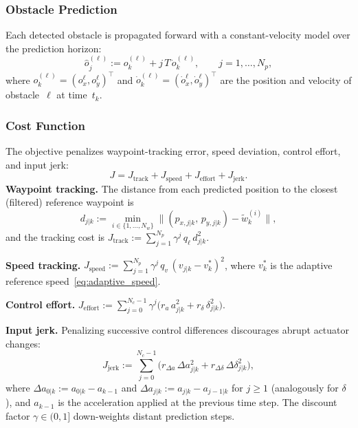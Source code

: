\documentclass[conference]{IEEEtran}
\begin{document}
\subsubsection{Obstacle Prediction}

Each detected obstacle is propagated forward with a
constant-velocity model over the prediction horizon:
\begin{equation}\label{eq:obs_pred}
  \hat{o}_j^{(\ell)} := o_k^{(\ell)} + j\,T\,\dot{o}_k^{(\ell)},
  \qquad j = 1,\ldots,N_p,
\end{equation}
where $o_k^{(\ell)} = (o_x^\ell, o_y^\ell)^\top$ and
$\dot{o}_k^{(\ell)} = (\dot{o}_x^\ell, \dot{o}_y^\ell)^\top$
are the position and velocity of obstacle~$\ell$ at time~$t_k$.

\subsubsection{Cost Function}

The objective penalizes waypoint-tracking error, speed deviation,
control effort, and input jerk:
\begin{equation}\label{eq:mpc_cost}
  J = J_{\mathrm{track}} + J_{\mathrm{speed}}
    + J_{\mathrm{effort}} + J_{\mathrm{jerk}}.
\end{equation}
\textbf{Waypoint tracking.} The distance from each predicted
position to the closest (filtered) reference waypoint is
\begin{equation}\label{eq:closest_wp}
  d_{j|k} := \min_{i \in \{1,\ldots,N_w\}}
  \bigl\|(p_{x,j|k},\, p_{y,j|k})
  - \tilde{w}^{(i)}_k\bigr\|,
\end{equation}
and the tracking cost is
$J_{\mathrm{track}} := \sum_{j=1}^{N_p}
  \gamma^j\, q_\ell \, d_{j|k}^2$.

\noindent\textbf{Speed tracking.}
$J_{\mathrm{speed}} := \sum_{j=1}^{N_p}
  \gamma^j\, q_v\, (v_{j|k} - v^*_k)^2$,
where $v^*_k$ is the adaptive reference speed~\eqref{eq:adaptive_speed}.

\noindent\textbf{Control effort.}
$J_{\mathrm{effort}} := \sum_{j=0}^{N_c-1}
  \gamma^j\bigl(r_a\,a_{j|k}^2 + r_\delta\,\delta_{j|k}^2\bigr)$.

\noindent\textbf{Input jerk.}
Penalizing successive control differences discourages abrupt
actuator changes:
\begin{equation}\label{eq:jerk}
  J_{\mathrm{jerk}} :=
  \sum_{j=0}^{N_c-1}
  \bigl(r_{\Delta a}\,\Delta a_{j|k}^2
  + r_{\Delta\delta}\,\Delta\delta_{j|k}^2\bigr),
\end{equation}
where $\Delta a_{0|k} := a_{0|k} - a_{k-1}$ and
$\Delta a_{j|k} := a_{j|k} - a_{j-1|k}$ for $j \ge 1$
(analogously for $\delta$), and $a_{k-1}$ is the acceleration
applied at the previous time step.
The discount factor $\gamma \in (0,1]$ down-weights distant
prediction steps.
\end{document}
